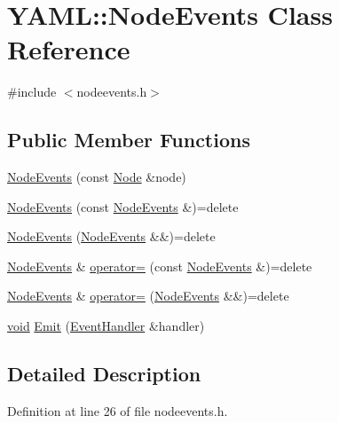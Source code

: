 \hypertarget{class_y_a_m_l_1_1_node_events}{}\section{Y\+A\+ML\+::Node\+Events Class Reference}
\label{class_y_a_m_l_1_1_node_events}


{\ttfamily \#include $<$nodeevents.\+h$>$}

\subsection*{Public Member Functions}
\begin{DoxyCompactItemize}
\item 
\mbox{\hyperlink{class_y_a_m_l_1_1_node_events_a6d7cb9355bf6b28ee9459b958b52aa30}{Node\+Events}} (const \mbox{\hyperlink{class_y_a_m_l_1_1_node}{Node}} \&node)
\item 
\mbox{\hyperlink{class_y_a_m_l_1_1_node_events_a2ad7ac142c553616159dece04a8d2aff}{Node\+Events}} (const \mbox{\hyperlink{class_y_a_m_l_1_1_node_events}{Node\+Events}} \&)=delete
\item 
\mbox{\hyperlink{class_y_a_m_l_1_1_node_events_a5f7ec79a7ec40599a8bc1d77c528e00a}{Node\+Events}} (\mbox{\hyperlink{class_y_a_m_l_1_1_node_events}{Node\+Events}} \&\&)=delete
\item 
\mbox{\hyperlink{class_y_a_m_l_1_1_node_events}{Node\+Events}} \& \mbox{\hyperlink{class_y_a_m_l_1_1_node_events_a26db8c756e2eaba3f35760e49896fb4c}{operator=}} (const \mbox{\hyperlink{class_y_a_m_l_1_1_node_events}{Node\+Events}} \&)=delete
\item 
\mbox{\hyperlink{class_y_a_m_l_1_1_node_events}{Node\+Events}} \& \mbox{\hyperlink{class_y_a_m_l_1_1_node_events_a7ca672a0b0c4dbfc598ade293eb30428}{operator=}} (\mbox{\hyperlink{class_y_a_m_l_1_1_node_events}{Node\+Events}} \&\&)=delete
\item 
\mbox{\hyperlink{glad_8h_a950fc91edb4504f62f1c577bf4727c29}{void}} \mbox{\hyperlink{class_y_a_m_l_1_1_node_events_a78054559195250e112ee535d32b984e3}{Emit}} (\mbox{\hyperlink{class_y_a_m_l_1_1_event_handler}{Event\+Handler}} \&handler)
\end{DoxyCompactItemize}


\subsection{Detailed Description}


Definition at line 26 of file nodeevents.\+h.



